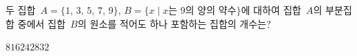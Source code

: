 두 집합~$A=\{1,\,3,\,5,\,7,\,9\}$, $B=\{x \mid x$는 $9$의 양의 약수$\}$에 대하여 집합~$A$의 부분집합 중에서 집합~$B$의 원소를 적어도 하나 포함하는 집합의 개수는?
\begin{choices32}{$8$}{$16$}{$24$}{$28$}{$32$}\end{choices32}
